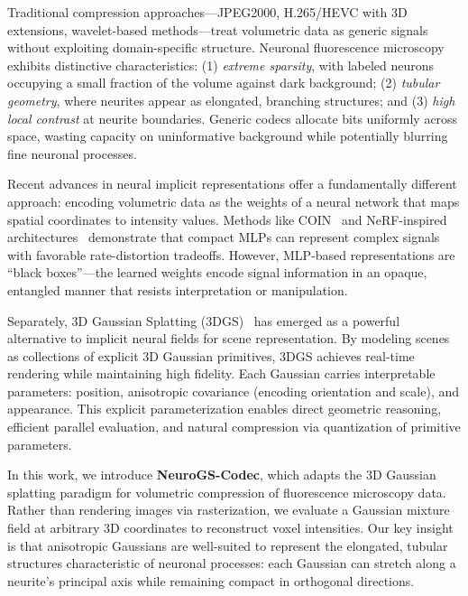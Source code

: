 \documentclass[11pt,a4paper]{article}
\begin{document}
Traditional compression approaches---JPEG2000, H.265/HEVC with 3D extensions, wavelet-based methods---treat volumetric data as generic signals without exploiting domain-specific structure. Neuronal fluorescence microscopy exhibits distinctive characteristics: (1) \emph{extreme sparsity}, with labeled neurons occupying a small fraction of the volume against dark background; (2) \emph{tubular geometry}, where neurites appear as elongated, branching structures; and (3) \emph{high local contrast} at neurite boundaries. Generic codecs allocate bits uniformly across space, wasting capacity on uninformative background while potentially blurring fine neuronal processes.

Recent advances in neural implicit representations offer a fundamentally different approach: encoding volumetric data as the weights of a neural network that maps spatial coordinates to intensity values. Methods like COIN~\cite{dupont2021coin} and NeRF-inspired architectures~\cite{mildenhall2020nerf} demonstrate that compact MLPs can represent complex signals with favorable rate-distortion tradeoffs. However, MLP-based representations are ``black boxes''---the learned weights encode signal information in an opaque, entangled manner that resists interpretation or manipulation.

Separately, 3D Gaussian Splatting (3DGS)~\cite{kerbl20233d} has emerged as a powerful alternative to implicit neural fields for scene representation. By modeling scenes as collections of explicit 3D Gaussian primitives, 3DGS achieves real-time rendering while maintaining high fidelity. Each Gaussian carries interpretable parameters: position, anisotropic covariance (encoding orientation and scale), and appearance. This explicit parameterization enables direct geometric reasoning, efficient parallel evaluation, and natural compression via quantization of primitive parameters.

In this work, we introduce \textbf{NeuroGS-Codec}, which adapts the 3D Gaussian splatting paradigm for volumetric compression of fluorescence microscopy data. Rather than rendering images via rasterization, we evaluate a Gaussian mixture field at arbitrary 3D coordinates to reconstruct voxel intensities. Our key insight is that anisotropic Gaussians are well-suited to represent the elongated, tubular structures characteristic of neuronal processes: each Gaussian can stretch along a neurite's principal axis while remaining compact in orthogonal directions.
\end{document}
